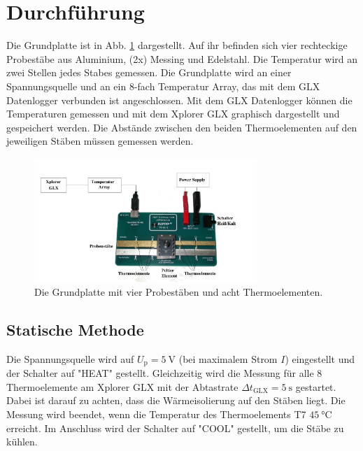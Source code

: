 \section{Durchführung}
\label{sec:Durchführung}
Die Grundplatte ist in Abb. \ref{fig:grundplatte} dargestellt.
Auf ihr befinden sich vier rechteckige Probestäbe aus Aluminium, (2x) Messing und Edelstahl.
Die Temperatur wird an zwei Stellen jedes Stabes gemessen.
Die Grundplatte wird an einer Spannungsquelle und an ein 8-fach Temperatur Array, das mit dem GLX Datenlogger verbunden ist angeschlossen.
Mit dem GLX Datenlogger können die Temperaturen gemessen und mit dem Xplorer GLX graphisch dargestellt und gespeichert werden.
Die Abstände zwischen den beiden Thermoelementen auf den jeweiligen Stäben müssen gemessen werden.
\begin{figure}
    \centering
    \includegraphics[width=0.75\textwidth]{content/data/glx.jpg}
    \caption{Die Grundplatte mit vier Probestäben und acht Thermoelementen. \cite[3]{anleitung}}
    \label{fig:grundplatte}
\end{figure}

\subsection{Statische Methode}
Die Spannungsquelle wird auf $U_\text{p} = \SI{5}{\volt}$ (bei maximalem Strom $I$) eingestellt und der Schalter auf "HEAT" gestellt.
Gleichzeitig wird die Messung für alle 8 Thermoelemente am Xplorer GLX mit der Abtastrate $\Delta t_\text{GLX} = \SI{5}{\second}$ gestartet.
Dabei ist darauf zu achten, dass die Wärmeisolierung auf den Stäben liegt.
Die Messung wird beendet, wenn die Temperatur des Thermoelements T7 $\SI{45}{\celsius}$ erreicht.
Im Anschluss wird der Schalter auf "COOL" gestellt, um die Stäbe zu kühlen.

